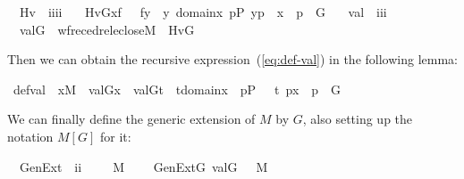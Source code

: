 \begin{isabelle}
\isamarkupfalse%
\isanewline
\ \ Hv\ {\isacharcolon}{\isacharcolon}\ {\isachardoublequoteopen}i{\isasymRightarrow}i{\isasymRightarrow}i{\isasymRightarrow}i{\isachardoublequoteclose}\ \isanewline
\ \ {\isachardoublequoteopen}Hv{\isacharparenleft}G{\isacharcomma}x{\isacharcomma}f{\isacharparenright}\ {\isacharequal}{\isacharequal}\ {\isacharbraceleft}\ f{\isacharbackquote}y\ {\isachardot}{\isachardot}\ y{\isasymin}\ domain{\isacharparenleft}x{\isacharparenright}{\isacharcomma}\ {\isasymexists}p{\isasymin}P{\isachardot}\ {\isacharless}y{\isacharcomma}p{\isachargreater}\ {\isasymin}\ x\ {\isasymand}\ p\ {\isasymin}\ G\ {\isacharbraceright}{\isachardoublequoteclose}\isanewline
\isanewline
{}\isamarkupfalse%
\isanewline
\ \ val\ {\isacharcolon}{\isacharcolon}\ {\isachardoublequoteopen}i{\isasymRightarrow}i{\isasymRightarrow}i{\isachardoublequoteclose}\ \isanewline
\ \ {\isachardoublequoteopen}val{\isacharparenleft}G{\isacharcomma}{\isasymtau}{\isacharparenright}\ {\isacharequal}{\isacharequal}\ wfrec{\isacharparenleft}edrel{\isacharparenleft}eclose{\isacharparenleft}M{\isacharparenright}{\isacharparenright}{\isacharcomma}\ {\isasymtau}\ {\isacharcomma}Hv{\isacharparenleft}G{\isacharparenright}{\isacharparenright}{\isachardoublequoteclose}
\end{isabelle}
Then we can obtain the recursive expression~(\ref{eq:def-val}) in the
following lemma:
%
\begin{isabelle}
\isamarkupfalse%
\ def{\isacharunderscore}val{\isacharcolon}\ \ {\isachardoublequoteopen}x{\isasymin}M\ {\isasymLongrightarrow}\ val{\isacharparenleft}G{\isacharcomma}x{\isacharparenright}\ {\isacharequal}\ {\isacharbraceleft}val{\isacharparenleft}G{\isacharcomma}t{\isacharparenright}\ {\isachardot}{\isachardot}\ t{\isasymin}domain{\isacharparenleft}x{\isacharparenright}\ {\isacharcomma}\ {\isasymexists}p{\isasymin}P\ {\isachardot}\ \ {\isasymlangle}t{\isacharcomma}\ p{\isasymrangle}{\isasymin}x\ {\isasymand}\ p\ {\isasymin}\ G\ {\isacharbraceright}{\isachardoublequoteclose}
\end{isabelle}

We can finally define the generic extension of $M$ by $G$, also
setting up the notation $M[G]$ for it:
\begin{isabelle}
\isamarkupfalse%
\isanewline
\ \ GenExt\ {\isacharcolon}{\isacharcolon}\ {\isachardoublequoteopen}i{\isasymRightarrow}i{\isachardoublequoteclose}\ \ \ \ \ {\isacharparenleft}{\isachardoublequoteopen}M{\isacharbrackleft}{\isacharunderscore}{\isacharbrackright}{\isachardoublequoteclose}\ {}{}{\isacharparenright}\isanewline
\ \ \ {\isachardoublequoteopen}GenExt{\isacharparenleft}G{\isacharparenright}{\isacharequal}{\isacharequal}\ {\isacharbraceleft}val{\isacharparenleft}G{\isacharcomma}{\isasymtau}{\isacharparenright}{\isachardot}\ {\isasymtau}\ {\isasymin}\ M{\isacharbraceright}{\isachardoublequoteclose}
\end{isabelle}

